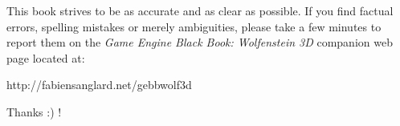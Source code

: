 This book strives to be as accurate and as clear as possible. If you find factual errors, spelling mistakes or merely ambiguities, please take a few minutes to report them on the \textit{Game Engine Black Book: Wolfenstein 3D} companion web page located at:\\
\par
http://fabiensanglard.net/gebbwolf3d\\
\par
Thanks :) !